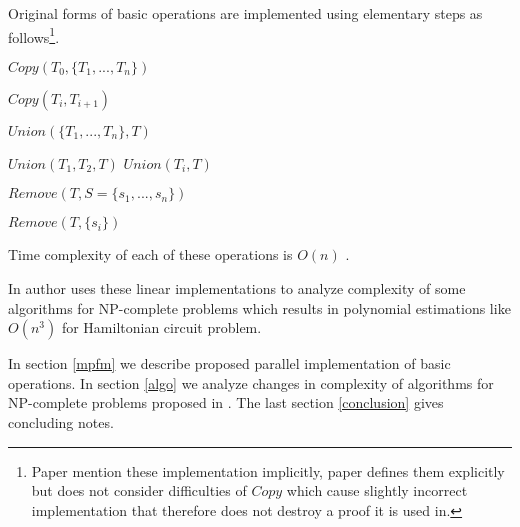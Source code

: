 Original forms of basic operations are implemented using elementary steps as follows\footnote{Paper \cite{Amos:1997} mention these implementation implicitly, paper \cite{Katsanyi:2003} defines them explicitly but does not consider difficulties of $Copy$ which cause slightly incorrect implementation that therefore does not destroy a proof it is used in.}.

\PROCEDURE $Copy(T_0, \{T_1, ..., T_n\})$
\begin{algorithmic}[1]
  \STATE $Copy(T_{i}, T_{i+1})$ 
\ENDFOR
\end{algorithmic}

\PROCEDURE $Union(\{T_1, ..., T_n\}, T)$
\begin{algorithmic}[1]
\STATE $Union(T_1, T_2, T)$
	\STATE $Union(T_i, T)$
\ENDFOR
\end{algorithmic}

\PROCEDURE $Remove(T, S=\{s_1, ..., s_n\})$
\begin{algorithmic}[1]
	\STATE $Remove(T, \{s_i\})$
\ENDFOR
\end{algorithmic}

Time complexity of each of these operations is $O(n)$ \cite{Amos:1997, Katsanyi:2003}.

In \cite{Katsanyi:2003} author uses these linear implementations to analyze complexity of some algorithms for NP-complete problems which results in polynomial estimations like $O(n^3)$ for Hamiltonian circuit problem.

In section \ref{mpfm} we describe proposed parallel implementation of basic operations. In section \ref{algo} we analyze changes in complexity of algorithms for NP-complete problems proposed in \cite{Katsanyi:2003}. The last section \ref{conclusion} gives concluding notes.